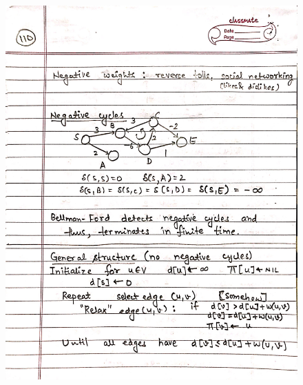\begin{figure}[H]
    \centering
    \includegraphics[width=16cm, height=21cm]{"./MIT-6.006/MIT-6006-110"}
\end{figure}
\newpage
